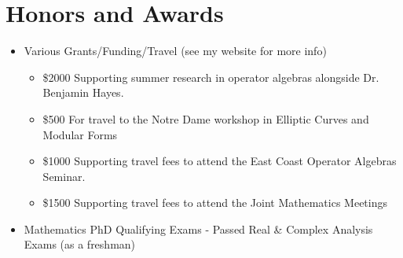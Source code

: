 \documentclass[11pt,letterpaper,sans]{moderncv}
\begin{document}
\section{Honors and Awards}
\begin{itemize}
  \item Various Grants/Funding/Travel (see my website for more info)
  \begin{itemize}
    \item \$2000 Supporting summer research in operator algebras alongside Dr. Benjamin Hayes.
    \item \$500 For travel to the Notre Dame workshop in Elliptic Curves and Modular Forms
    \item \$1000 Supporting travel fees to attend the East Coast Operator Algebras Seminar. 
    \item \$1500 Supporting travel fees to attend the Joint Mathematics Meetings
  \end{itemize}
  \item Mathematics PhD Qualifying Exams - Passed Real \& Complex Analysis Exams (as a freshman)


  
\end{itemize}
\end{document}
